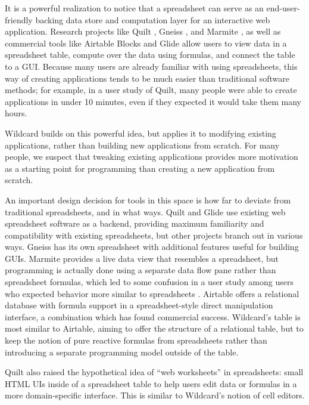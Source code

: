 \documentclass[english,submission]{programming}
\begin{document}
It is a powerful realization to notice that a spreadsheet can serve as
an end-user-friendly backing data store and computation layer for an
interactive web application. Research projects like Quilt
\autocite{benson2014}, Gneiss \autocite{chang2014}, and Marmite
\autocite{wong2007}, as well as commercial tools like Airtable Blocks
\autocite{zotero-79} and Glide \autocite{zotero-81} allow users to view
data in a spreadsheet table, compute over the data using formulas, and
connect the table to a GUI. Because many users are already familiar with
using spreadsheets, this way of creating applications tends to be much
easier than traditional software methods; for example, in a user study
of Quilt, many people were able to create applications in under 10
minutes, even if they expected it would take them many hours.

Wildcard builds on this powerful idea, but applies it to modifying
existing applications, rather than building new applications from
scratch. For many people, we suspect that tweaking existing applications
provides more motivation as a starting point for programming than
creating a new application from scratch.

An important design decision for tools in this space is how far to
deviate from traditional spreadsheets, and in what ways. Quilt and Glide
use existing web spreadsheet software as a backend, providing maximum
familiarity and compatibility with existing spreadsheets, but other
projects branch out in various ways. Gneiss has its own spreadsheet with
additional features useful for building GUIs. Marmite provides a live
data view that resembles a spreadsheet, but programming is actually done
using a separate data flow pane rather than spreadsheet formulas, which
led to some confusion in a user study among users who expected behavior
more similar to spreadsheets \autocite{wong2007}. Airtable offers a
relational database with formula support in a spreadsheet-style direct
manipulation interface, a combination which has found commercial
success. Wildcard's table is most similar to Airtable, aiming to offer
the structure of a relational table, but to keep the notion of pure
reactive formulas from spreadsheets rather than introducing a separate
programming model outside of the table.

Quilt also raised the hypothetical idea of ``web worksheets'' in
spreadsheets: small HTML UIs inside of a spreadsheet table to help users
edit data or formulas in a more domain-specific interface. This is
similar to Wildcard's notion of cell editors.
\end{document}

